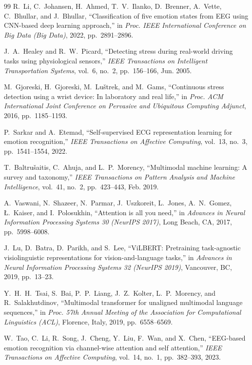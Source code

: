 \documentclass[12pt,letterpaper]{report}
\begin{document}
\begin{thebibliography}{99}
R.~Li, C.~Johansen, H.~Ahmed, T.~V.~Ilanko, D.~Brenner, A.~Vette, C.~Bhullar, and J.~Bhullar, ``Classification of five emotion states from EEG using CNN-based deep learning approach,'' in \textit{Proc. IEEE International Conference on Big Data (Big Data)}, 2022, pp.~2891--2896.

J.~A.~Healey and R.~W.~Picard, ``Detecting stress during real-world driving tasks using physiological sensors,'' \textit{IEEE Transactions on Intelligent Transportation Systems}, vol.~6, no.~2, pp.~156--166, Jun. 2005.

M.~Gjoreski, H.~Gjoreski, M.~Lu\v{s}trek, and M.~Gams, ``Continuous stress detection using a wrist device: In laboratory and real life,'' in \textit{Proc. ACM International Joint Conference on Pervasive and Ubiquitous Computing Adjunct}, 2016, pp.~1185--1193.

P.~Sarkar and A.~Etemad, ``Self-supervised ECG representation learning for emotion recognition,'' \textit{IEEE Transactions on Affective Computing}, vol.~13, no.~3, pp.~1541--1554, 2022.

T.~Baltru\v{s}aitis, C.~Ahuja, and L.~P.~Morency, ``Multimodal machine learning: A survey and taxonomy,'' \textit{IEEE Transactions on Pattern Analysis and Machine Intelligence}, vol.~41, no.~2, pp.~423--443, Feb. 2019.

A.~Vaswani, N.~Shazeer, N.~Parmar, J.~Uszkoreit, L.~Jones, A.~N.~Gomez, {\L}.~Kaiser, and I.~Polosukhin, ``Attention is all you need,'' in \textit{Advances in Neural Information Processing Systems 30 (NeurIPS 2017)}, Long Beach, CA, 2017, pp.~5998--6008.

J.~Lu, D.~Batra, D.~Parikh, and S.~Lee, ``ViLBERT: Pretraining task-agnostic visiolinguistic representations for vision-and-language tasks,'' in \textit{Advances in Neural Information Processing Systems 32 (NeurIPS 2019)}, Vancouver, BC, 2019, pp.~13--23.

Y.~H.~H.~Tsai, S.~Bai, P.~P.~Liang, J.~Z.~Kolter, L.~P.~Morency, and R.~Salakhutdinov, ``Multimodal transformer for unaligned multimodal language sequences,'' in \textit{Proc. 57th Annual Meeting of the Association for Computational Linguistics (ACL)}, Florence, Italy, 2019, pp.~6558--6569.

W.~Tao, C.~Li, R.~Song, J.~Cheng, Y.~Liu, F.~Wan, and X.~Chen, ``EEG-based emotion recognition via channel-wise attention and self attention,'' \textit{IEEE Transactions on Affective Computing}, vol.~14, no.~1, pp.~382--393, 2023.


\end{thebibliography}
\end{document}
